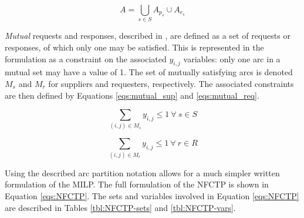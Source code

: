\begin{equation}\label{eqs:arc-union}
  A = \bigcup_{s \in S} A_{p_s} \cup A_{e_s}
\end{equation}


\textit{Mutual} requests and responses, described in , are
defined as a set of requests or responses, of which only one may be
satisfied. This is represented in the formulation as a constraint on the
associated $y_{i,j}$ variables: only one arc in a mutual set may have a value of
1. The set of mutually satisfying arcs is denoted $M_s$ and $M_r$ for suppliers
and requesters, respectively. The associated constraints are then defined by
Equations \ref{eqs:mutual_sup} and \ref{eqs:mutual_req}.

\begin{equation}\label{eqs:mutual_sup}
  \sum_{(i, j) \in M_{s}} y_{i,j} \leq 1 \: \forall \: s \in S 
\end{equation}

\begin{equation}\label{eqs:mutual_req}
  \sum_{(i, j) \in M_{r}} y_{i,j} \leq 1 \: \forall \: r \in R 
\end{equation}


Using the described arc partition notation allows for a much simpler written
formulation of the MILP. The full formulation of the NFCTP is shown in Equation
\ref{eqs:NFCTP}.  The sets and variables involved in Equation \ref{eqs:NFCTP}
are described in Tables \ref{tbl:NFCTP-sets} and \ref{tbl:NFCTP-vars}.


